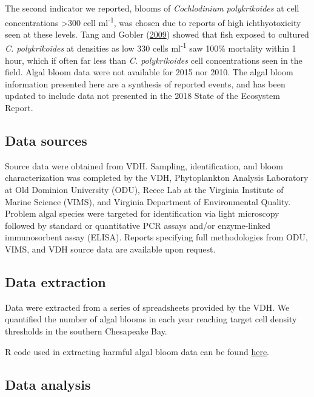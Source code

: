 \documentclass[
]{book}
\begin{document}
The second indicator we reported, blooms of \emph{Cochlodinium polykrikoides} at cell concentrations \textgreater300 cell ml\textsuperscript{-1}, was chosen due to reports of high ichthyotoxicity seen at these levels. Tang and Gobler (\protect\hyperlink{ref-Tang2009}{2009}) showed that fish exposed to cultured \emph{C. polykrikoides} at densities as low 330 cells ml\textsuperscript{-1} saw 100\% mortality within 1 hour, which if often far less than \emph{C. polykrikoides} cell concentrations seen in the field. Algal bloom data were not available for 2015 nor 2010. The algal bloom information presented here are a synthesis of reported events, and has been updated to include data not presented in the 2018 State of the Ecosystem Report.

\hypertarget{data-sources-23}{%
\subsection{Data sources}\label{data-sources-23}}

Source data were obtained from VDH. Sampling, identification, and bloom characterization was completed by the VDH, Phytoplankton Analysis Laboratory at Old Dominion University (ODU), Reece Lab at the Virginia Institute of Marine Science (VIMS), and Virginia Department of Environmental Quality. Problem algal species were targeted for identification via light microscopy followed by standard or quantitative PCR assays and/or enzyme-linked immunosorbent assay (ELISA). Reports specifying full methodologies from ODU, VIMS, and VDH source data are available upon request.

\hypertarget{data-extraction-20}{%
\subsection{Data extraction}\label{data-extraction-20}}

Data were extracted from a series of spreadsheets provided by the VDH. We quantified the number of algal blooms in each year reaching target cell density thresholds in the southern Chesapeake Bay.



R code used in extracting harmful algal bloom data can be found \href{https://github.com/NOAA-EDAB/tech-doc/tree/master/R/stored_scripts/mab_hab_extraction.R}{here}.

\hypertarget{data-analysis-21}{%
\subsection{Data analysis}\label{data-analysis-21}}
\end{document}
